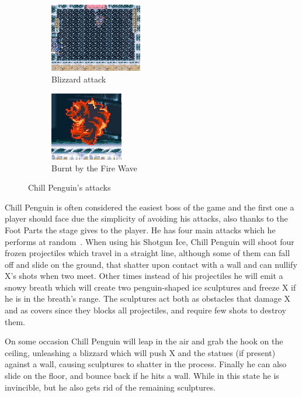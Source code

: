 \begin{figure}
	\centering
	\ContinuedFloat
	\begin{subfigure}[c]{0.4\textwidth}
		\centering
		\includegraphics[height=3cm]{figures/X1/Chill_penguin/Chill_blizzard.jpg}
		\caption{Blizzard attack}
	\end{subfigure}
	\begin{subfigure}[c]{0.4\textwidth}
		\centering
		\includegraphics[height=3cm]{figures/X1/Chill_penguin/Chill_burn.jpg}
		\caption{Burnt by the Fire Wave}
	\end{subfigure}
	\caption{Chill Penguin's attacks}
\end{figure}

Chill Penguin is often considered the easiest boss of the game and the first one a player should face due the simplicity of avoiding his attacks, also thanks to the Foot Parts the stage gives to the player. He has four main attacks which he performs at random~\cite{wiki:Chill_Penguin}. When using his Shotgun Ice, Chill Penguin will shoot four frozen projectiles which travel in a straight line, although some of them  can fall off and slide on the ground, that shatter upon contact with a wall and can nullify X's shots when two meet. Other times instead of his projectiles he will emit a snowy breath which will create two penguin-shaped ice sculptures and freeze X if he is in the breath's range. The sculptures act both as obstacles that damage X and as covers since they blocks all projectiles, and require few shots to destroy them. 

On some occasion Chill Penguin will leap in the air and grab the hook on the ceiling, unleashing a blizzard which will push X and the statues (if present) against a wall, causing sculptures to shatter in the process. Finally he can also slide on the floor, and bounce back if he hits a wall. While in this state he is invincible, but he also gets rid of the remaining sculptures.  

